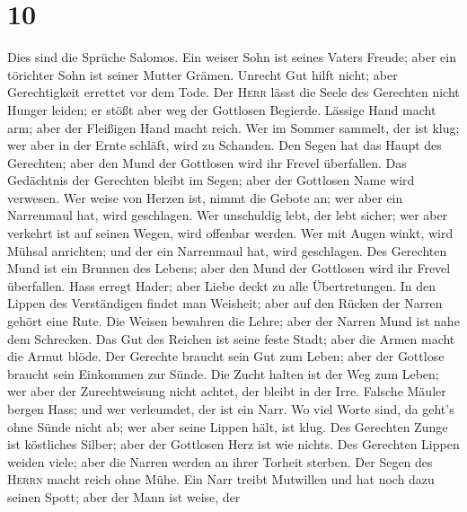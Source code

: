 \hypertarget{section-9}{%
\section{10}\label{section-9}}

 Dies sind die Sprüche Salomos. Ein weiser Sohn ist seines
Vaters Freude; aber ein törichter Sohn ist seiner Mutter Grämen.
 Unrecht Gut hilft nicht; aber Gerechtigkeit errettet vor
dem Tode.  Der \textsc{Herr} lässt die Seele des Gerechten
nicht Hunger leiden; er stößt aber weg der Gottlosen Begierde.
 Lässige Hand macht arm; aber der Fleißigen Hand macht
reich.  Wer im Sommer sammelt, der ist klug; wer aber in
der Ernte schläft, wird zu Schanden.  Den Segen hat das
Haupt des Gerechten; aber den Mund der Gottlosen wird ihr Frevel
überfallen.  Das Gedächtnis der Gerechten bleibt im Segen;
aber der Gottlosen Name wird verwesen.  Wer weise von
Herzen ist, nimmt die Gebote an; wer aber ein Narrenmaul hat, wird
geschlagen.  Wer unschuldig lebt, der lebt sicher; wer
aber verkehrt ist auf seinen Wegen, wird offenbar werden.
 Wer mit Augen winkt, wird Mühsal anrichten; und der ein
Narrenmaul hat, wird geschlagen.  Des Gerechten Mund ist
ein Brunnen des Lebens; aber den Mund der Gottlosen wird ihr Frevel
überfallen.  Hass erregt Hader; aber Liebe deckt zu alle
Übertretungen.  In den Lippen des Verständigen findet man
Weisheit; aber auf den Rücken der Narren gehört eine Rute.
 Die Weisen bewahren die Lehre; aber der Narren Mund ist
nahe dem Schrecken.  Das Gut des Reichen ist seine feste
Stadt; aber die Armen macht die Armut blöde.  Der
Gerechte braucht sein Gut zum Leben; aber der Gottlose braucht sein
Einkommen zur Sünde.  Die Zucht halten ist der Weg zum
Leben; wer aber der Zurechtweisung nicht achtet, der bleibt in der Irre.
 Falsche Mäuler bergen Hass; und wer verleumdet, der ist
ein Narr.  Wo viel Worte sind, da geht's ohne Sünde nicht
ab; wer aber seine Lippen hält, ist klug.  Des Gerechten
Zunge ist köstliches Silber; aber der Gottlosen Herz ist wie nichts.
 Des Gerechten Lippen weiden viele; aber die Narren
werden an ihrer Torheit sterben.  Der Segen des
\textsc{Herrn} macht reich ohne Mühe.  Ein Narr treibt
Mutwillen und hat noch dazu seinen Spott; aber der Mann ist weise, der
